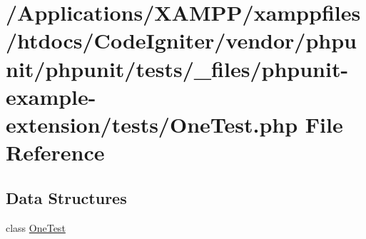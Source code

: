 \hypertarget{__files_2phpunit-example-extension_2tests_2_one_test_8php}{}\section{/\+Applications/\+X\+A\+M\+P\+P/xamppfiles/htdocs/\+Code\+Igniter/vendor/phpunit/phpunit/tests/\+\_\+files/phpunit-\/example-\/extension/tests/\+One\+Test.php File Reference}
\label{__files_2phpunit-example-extension_2tests_2_one_test_8php}
\subsection*{Data Structures}
\begin{DoxyCompactItemize}
\item 
class \mbox{\hyperlink{class_one_test}{One\+Test}}
\end{DoxyCompactItemize}
